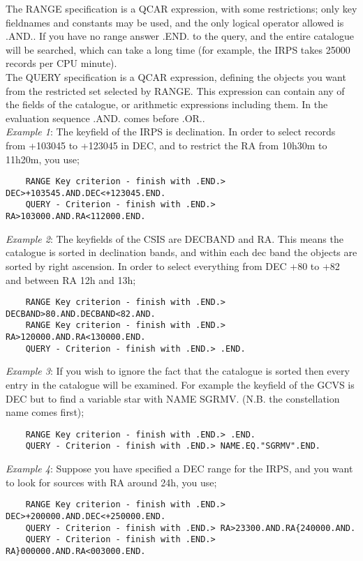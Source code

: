 The RANGE specification is a QCAR expression, with some restrictions; only
key fieldnames and constants may be used, and the only logical operator 
allowed is .AND..
If you have no range answer .END. to the query, and the entire catalogue will 
be searched, which can take a long time (for example, the IRPS takes 25000 
records per CPU minute).\\
The QUERY specification is a QCAR expression, defining the objects you want
from the restricted set selected by RANGE.
This expression can contain any of the fields of the catalogue, or arithmetic
expressions including them.
In the evaluation sequence .AND. comes before .OR..\\
{\em Example 1}: The keyfield of the IRPS is declination. 
In order to select records from +103045 to +123045 in DEC, and to restrict
the RA from 10h30m to 11h20m, you use;
\begin{verbatim}
    RANGE Key criterion - finish with .END.> DEC>+103545.AND.DEC<+123045.END.
    QUERY - Criterion - finish with .END.> RA>103000.AND.RA<112000.END.
\end{verbatim}
{\em Example 2}: The keyfields of the CSIS are DECBAND and RA. 
This means the catalogue is sorted in declination bands, and within each dec
band the objects are sorted by right ascension.
In order to select everything from DEC +80 to +82 and between RA 12h and 13h;
\begin{verbatim}
    RANGE Key criterion - finish with .END.> DECBAND>80.AND.DECBAND<82.AND.
    RANGE Key criterion - finish with .END.> RA>120000.AND.RA<130000.END.
    QUERY - Criterion - finish with .END.> .END.
\end{verbatim}
{\em Example 3}: If you wish to ignore the fact that the catalogue is sorted
then every entry in the catalogue will be examined. For example the keyfield 
of the GCVS is DEC but to find a variable star with NAME SGRMV.
(N.B. the constellation name comes first);
\begin{verbatim}
    RANGE Key criterion - finish with .END.> .END.
    QUERY - Criterion - finish with .END.> NAME.EQ."SGRMV".END.
\end{verbatim}
{\em Example 4}: Suppose you have specified a DEC range for the IRPS, and you 
want to look for sources with RA around 24h, you use;
\begin{verbatim}
    RANGE Key criterion - finish with .END.> DEC>+200000.AND.DEC<+250000.END.
    QUERY - Criterion - finish with .END.> RA>23300.AND.RA{240000.AND.
    QUERY - Criterion - finish with .END.> RA}000000.AND.RA<003000.END.
\end{verbatim}
